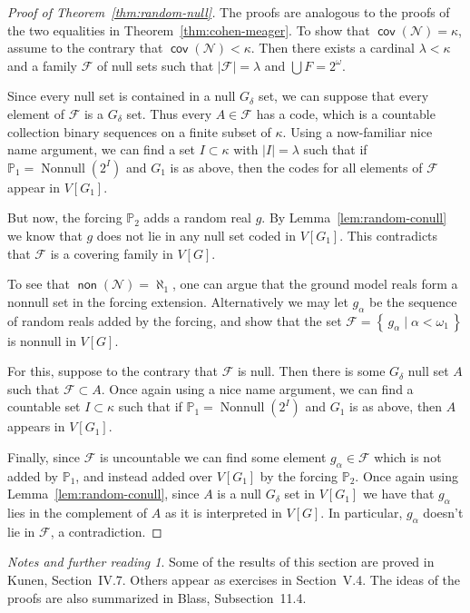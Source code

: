 \documentclass[11pt,oneside,a4paper]{amsbook}
\newcommand{\set}[1]{\left\{\,#1\,\right\}}
\newcommand{\PP}{\mathbb P}
\newcommand{\Null}{\mathcal N}
\DeclareMathOperator{\non}{\mathsf{non}}
\DeclareMathOperator{\cov}{\mathsf{cov}}
\DeclareMathOperator{\Nonnull}{Nonnull}
\theoremstyle{definition}
\theoremstyle{plain}
\theoremstyle{definition}
\theoremstyle{remark}
\newtheorem*{notes}{Notes and further reading}
\numberwithin{equation}{section}
\numberwithin{figure}{section}
\begin{document}
\begin{proof}[Proof of Theorem~\ref{thm:random-null}]
  The proofs are analogous to the proofs of the two equalities in Theorem~\ref{thm:cohen-meager}. To show that $\cov(\Null)=\kappa$, assume to the contrary that $\cov(\Null)<\kappa$. Then there exists a cardinal $\lambda<\kappa$ and a family $\mathcal F$ of null sets such that $|\mathcal F|=\lambda$ and $\bigcup F=2^\omega$.

  Since every null set is contained in a null $G_\delta$ set, we can suppose that every element of $\mathcal F$ is a $G_\delta$ set. Thus every $A\in\mathcal F$ has a code, which is a countable collection binary sequences on a finite subset of $\kappa$. Using a now-familiar nice name argument, we can find a set $I\subset\kappa$ with $|I|=\lambda$ such that if $\PP_1=\Nonnull(2^I)$ and $G_1$ is as above, then the codes for all elements of $\mathcal F$ appear in $V[G_1]$.

  But now, the forcing $\PP_2$ adds a random real $g$. By Lemma~\ref{lem:random-conull} we know that $g$ does not lie in any null set coded in $V[G_1]$. This contradicts that $\mathcal F$ is a covering family in $V[G]$.

  To see that $\non(\Null)=\aleph_1$, one can argue that the ground model reals form a nonnull set in the forcing extension. Alternatively we may let $g_\alpha$ be the sequence of random reals added by the forcing, and show that the set $\mathcal F=\set{g_\alpha\mid\alpha<\omega_1}$ is nonnull in $V[G]$.

  For this, suppose to the contrary that $\mathcal F$ is null. Then there is some $G_\delta$ null set $A$ such that $\mathcal F\subset A$. Once again using a nice name argument, we can find a countable set $I\subset\kappa$ such that if $\PP_1=\Nonnull(2^I)$ and $G_1$ is as above, then $A$ appears in $V[G_1]$.

  Finally, since $\mathcal F$ is uncountable we can find some element $g_\alpha\in\mathcal F$ which is not added by $\PP_1$, and instead added over $V[G_1]$ by the forcing $\PP_2$. Once again using Lemma~\ref{lem:random-conull}, since $A$ is a null $G_\delta$ set in $V[G_1]$ we have that $g_\alpha$ lies in the complement of $A$ as it is interpreted in $V[G]$. In particular, $g_\alpha$ doesn't lie in $\mathcal F$, a contradiction.
\end{proof}

\begin{notes}
  Some of the results of this section are proved in Kunen, Section~IV.7. Others appear as exercises in Section~V.4. The ideas of the proofs are also summarized in Blass, Subsection~11.4.
\end{notes}
\end{document}
